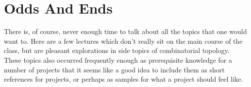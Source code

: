 	\chapter{Odds And Ends}
There is, of course, never enough time to talk about all the topics that one would want to. Here are a few lectures which don't really sit on the main course of the class, but are pleasant explorations in side topics of combinatorial topology. These topics also occurred frequently enough as prerequisite knowledge for a number of projects that it seems like a good idea to include them as short references for projects, or perhaps as samples for what a project should feel like. 
\newpage

\newpage

\newpage

\newpage

\newpage
